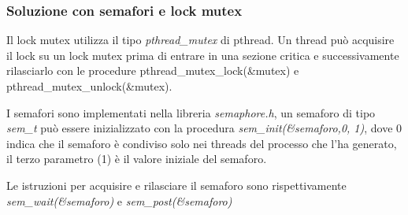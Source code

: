 \documentclass[10pt]{beamer}
\begin{document}
\begin{frame}[fragile]
	\frametitle{Soluzione con semafori e lock mutex}
		Il lock mutex utilizza il tipo \emph{pthread\_mutex} di pthread. Un thread può acquisire il lock su un lock mutex prima di entrare in una sezione critica e successivamente rilasciarlo con le procedure pthread\_mutex\_lock(\&mutex) e pthread\_mutex\_unlock(\&mutex).
		
		I semafori sono implementati nella libreria \emph{semaphore.h}, un semaforo di tipo \emph{sem\_t} può essere inizializzato con la procedura \emph{sem\_init(\&semaforo,0, 1)}, dove 0 indica che il semaforo è condiviso solo nei threads del processo che l'ha generato, il terzo parametro (1) è il valore iniziale del semaforo.
		
		Le istruzioni per acquisire e rilasciare il semaforo sono rispettivamente \emph{sem\_wait(\&semaforo)} e \emph{sem\_post(\&semaforo)}
\end{frame}
	
\end{document}
